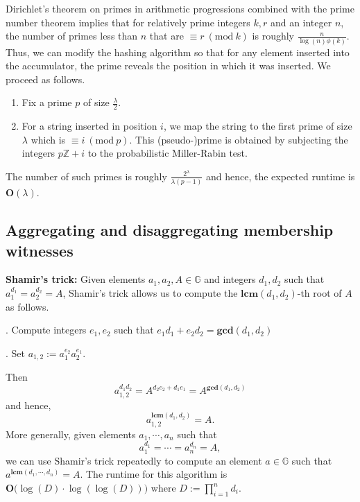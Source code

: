 \documentclass[11pt, lettersize, notitlepage, leqno, footskip=0.6cm]{article}
\newcommand{\bz}{\mathbb Z}
\newcommand{\mb}{\mathbb}
\newcommand{\mbf}{\mathbf}
\newcommand{\lam}{\lambda}
\newcommand{\vs}{\vspace{-0.15cm}}
\newcommand{\noin}{\noindent}
\newcommand{\Mod}[1]{\ (\mathrm{mod}\ #1)}
\newcommand{\LCM}{\mbf{lcm}}
\newcommand{\GCD}{\mbf{gcd}}
\numberwithin{equation}{section}
\begin{document}
Dirichlet's theorem on primes in arithmetic progressions combined with the prime number theorem implies that for relatively prime integers $k,r$ and an integer $n$, the number of primes less than $n$ that are $\equiv r\Mod{k}$ is roughly $\frac{n}{\log(n)\phi(k)}$. Thus, we can modify the hashing algorithm so that for any element inserted into the accumulator, the prime reveals the position in which it was inserted. We proceed as follows.\begin{enumerate}[wide, labelwidth=!, labelindent=0pt]\vspace{-0.1cm} 

\item Fix a prime $p$ of size $\frac{\lam}{2}$. \vs 

\item For a string inserted in position $i$, we map the string to the first prime of size $\lam$ which is $\equiv i\Mod{p}$. This (pseudo-)prime is obtained by subjecting the integers $p\bz+i$ to the probabilistic Miller-Rabin test. \end{enumerate} 

\noin The number of such primes is roughly \vs $\frac{2^{\lam}}{\lam (p-1)}$ and hence, the expected runtime is $\mbf{O}(\lam)$.






\subsection{\fontsize{11}{11}\selectfont Aggregating and disaggregating membership witnesses}

\noindent \textbf{Shamir's trick:} Given elements $a_1, a_2, A\in \mb{G}$ and integers $d_1, d_2$ such that $a_1^{d_1} = a_2^{d_2} = A$, Shamir's trick allows us to compute the $\LCM(d_1, d_2)$-th root of $A$ as follows.\vspace{0.1cm}

\noin 1. Compute integers $e_1, e_2$ such that $e_1d_1+e_2d_2 = \GCD(d_1, d_2)$

\noin 2. Set $a_{1,2}:= a_1^{e_2}a_2^{e_1} $. 

\noindent Then \vspace{-0.15cm}$$a_{1,2}^{d_1d_2} = A^{d_2e_2 + d_1e_1} = A^{\GCD(d_1,d_2)}$$ and hence, \vspace{-0.15cm}$$a_{1,2}^{\LCM(d_1,d_2)} = A.$$ More generally, given elements $a_1,\cdots,a_n$ such that \vs $$a_1^{d_1} = \cdots = a_n^{d_n} = A, $$ we can use Shamir's trick repeatedly to compute an element $a\in\mb{G}$ such that $a^{\LCM(d_1,\cdots,d_n)} = A.$ The runtime for this algorithm is $\mbf{O}\big(\log(D)\cdot \log(\log(D))\big)$ where $D:= \prod_{i=1}^n d_i$.
\end{document}
